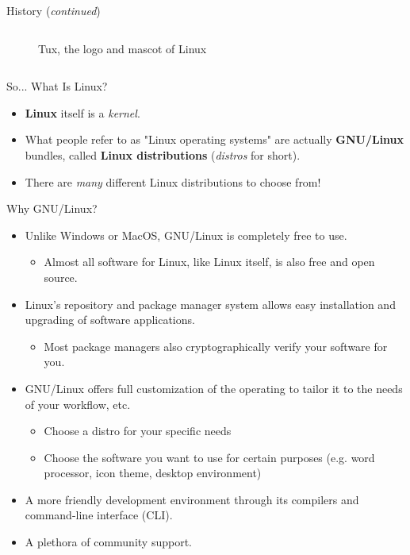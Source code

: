 \documentclass[11pt]{beamer}
\begin{document}
\begin{frame}{History (\textit{continued})}
\begin{columns}
\begin{column}{0.5\textwidth}
\begin{figure}
				\caption{Tux, the logo and mascot of Linux}
			\end{figure}
		\end{column}
	\end{columns}
\end{frame}

\begin{frame}{So... What Is Linux?}
	\begin{itemize}
		\item \textbf{Linux} itself is a \textit{kernel}.
		\item What people refer to as "Linux operating systems" are actually \textbf{GNU/Linux} bundles, called \textbf{Linux distributions} (\textit{distros} for short).
		\item There are \textit{many} different Linux distributions to choose from!
	\end{itemize}
\end{frame}

\begin{frame}{Why GNU/Linux?}
	\begin{itemize}
		\item<1-> Unlike Windows or MacOS, GNU/Linux is completely free to use.
		\begin{itemize}
			\item<1-> Almost all software for Linux, like Linux itself, is also free and open source.
		\end{itemize}
		\item<2-> Linux's repository and package manager system allows easy installation and upgrading of software applications.
		\begin{itemize}
			\item<2-> Most package managers also cryptographically verify your software for you.
		\end{itemize}
		\item<3-> GNU/Linux offers full customization of the operating to tailor it to the needs of your workflow, etc.
		\begin{itemize}
			\item<3-> Choose a distro for your specific needs
			\item<3-> Choose the software you want to use for certain purposes (e.g. word processor, icon theme, desktop environment)
		\end{itemize}
		\item<4-> A more friendly development environment through its compilers and command-line interface (CLI).
		\item<5-> A plethora of community support.
	\end{itemize}
\end{frame}
\end{document}
